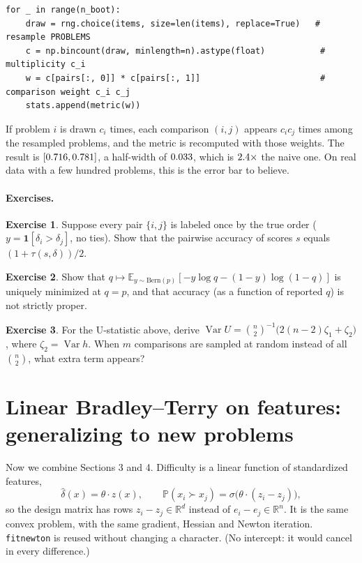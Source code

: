 \documentclass[11pt]{article}
\theoremstyle{definition}
\newtheorem{exercise}{Exercise}[section]
\theoremstyle{plain}
\theoremstyle{remark}
\newcommand{\R}{\mathbb{R}}
\newcommand{\E}{\mathbb{E}}
\renewcommand{\P}{\mathbb{P}}
\newcommand{\code}[1]{\texttt{#1}}
\renewcommand{\_}{\oldunderscore\allowbreak}
\newcommand{\file}[1]{\textcolor{blue!50!black}{\texttt{#1}}}
\DeclareMathOperator{\Var}{Var}
\newcommand{\codefrom}[1]{\par\smallskip\noindent{\footnotesize\textbf{From} \file{#1}}}
\begin{document}
\codefrom{src/calcdiff/evaluate.py}
\begin{lstlisting}
for _ in range(n_boot):
    draw = rng.choice(items, size=len(items), replace=True)   # resample PROBLEMS
    c = np.bincount(draw, minlength=n).astype(float)           # multiplicity c_i
    w = c[pairs[:, 0]] * c[pairs[:, 1]]                        # comparison weight c_i c_j
    stats.append(metric(w))
\end{lstlisting}
If problem $i$ is drawn $c_i$ times, each comparison $(i,j)$ appears $c_ic_j$ times among the resampled problems, and the metric is
recomputed with those weights. The result is $[0.716,0.781]$, a half-width of $0.033$, which is $2.4\times$ the naive one.
On real data with a few hundred problems, this is the error bar to believe.

\paragraph{Exercises.}
\begin{exercise}\label{ex:tau}
Suppose every pair $\{i,j\}$ is labeled once by the true order ($y=\mathbf 1[\delta_i>\delta_j]$, no ties). Show that the pairwise accuracy of scores $s$ equals $(1+\tau(s,\delta))/2$.
\end{exercise}
\begin{exercise}
Show that $q\mapsto\E_{y\sim\mathrm{Bern}(p)}[-y\log q-(1-y)\log(1-q)]$ is uniquely minimized at $q=p$, and that accuracy (as a function of reported $q$) is not strictly proper.
\end{exercise}
\begin{exercise}
For the U-statistic above, derive $\Var U=\binom n2^{-1}\bigl(2(n-2)\zeta_1+\zeta_2\bigr)$, where $\zeta_2=\Var h$. When $m$ comparisons are sampled at random instead of all $\binom n2$, what extra term appears?
\end{exercise}

\section{Linear Bradley--Terry on features: generalizing to new problems}
\label{sec:featbt}

Now we combine Sections 3 and 4. Difficulty is a linear function of standardized features,
\[
  \hat\delta(x)=\theta\cdot z(x),\qquad \P(x_i\succ x_j)=\sigma\bigl(\theta\cdot(z_i-z_j)\bigr),
\]
so the design matrix has rows $z_i-z_j\in\R^{d}$ instead of $e_i-e_j\in\R^n$. It is the same convex problem, with the same
gradient, Hessian and Newton iteration. \code{fit\_newton} is reused without changing a character. (No intercept:
it would cancel in every difference.)
\end{document}
